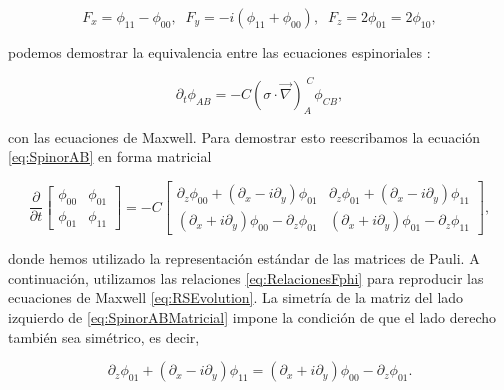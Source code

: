             \begin{equation}\label{eq:RelacionesFphi}
                F_x = \phi_{11} - \phi_{00},\;\; F_y = -i(\phi_{11} + \phi_{00}),\;\; F_z = 2\phi_{01}=2\phi_{10},
            \end{equation}

            podemos demostrar la equivalencia entre las ecuaciones espinoriales :

            \begin{equation}\label{eq:SpinorAB}
                \partial_t \phi_{AB} = -C(\mathbb{\sigma} \cdot \Vec{\nabla})_A^{\;C}\phi_{CB},
            \end{equation}

            con las ecuaciones de Maxwell. Para demostrar esto reescribamos la ecuación \ref{eq:SpinorAB} en forma matricial

            \begin{equation}\label{eq:SpinorABMatricial}
                \frac{\partial}{\partial t}
                \begin{bmatrix}
                    \phi_{00}&\phi_{01}\\
                    \phi_{01}&\phi_{11}
                \end{bmatrix} = -C
                \begin{bmatrix}
                    \partial_z\phi_{00} + \left(\partial_x - i\partial_y\right)\phi_{01} & \partial_z\phi_{01} + \left(\partial_x - i\partial_y\right)\phi_{11}\\
                    \left(\partial_x + i \partial_y \right)\phi_{00} - \partial_z\phi_{01} & \left(\partial_x + i\partial_y \right)\phi_{01} - \partial_z\phi_{11}
                \end{bmatrix},
            \end{equation}

            donde hemos utilizado la representación estándar de las matrices de Pauli. A continuación, utilizamos las relaciones \ref{eq:RelacionesFphi} para reproducir las ecuaciones de Maxwell \ref{eq:RSEvolution}. La simetría de la matriz del lado izquierdo de \ref{eq:SpinorABMatricial} impone la condición de que el lado derecho también sea simétrico, es decir,

            \begin{equation}
                \partial_z\phi_{01} + \left( \partial_x - i\partial_y\right)\phi_{11} = \left( \partial_x + i\partial_y \right)\phi_{00} - \partial_z \phi_{01}.
            \end{equation}

